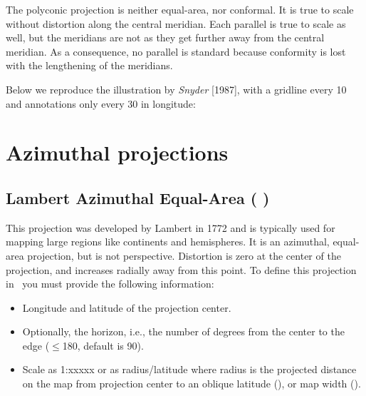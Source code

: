 The polyconic projection is neither equal-area, nor conformal. It is true to scale without distortion along the central meridian. Each parallel is true to scale as well, but the meridians are not as they get further away from the central meridian. As a consequence, no parallel is standard because conformity is lost with the lengthening of the meridians.

Below we reproduce the illustration by \emph{Snyder} [1987], with a gridline every 10\DS{} and annotations only every 30\DS{} in longitude:





\clearpage
\section{Azimuthal projections}

\subsection{Lambert Azimuthal Equal-Area ( )}

This projection was developed by Lambert in 1772 and is
typically used for mapping large regions like continents
and hemispheres.  It is an azimuthal, equal-area projection,
but is not perspective.  Distortion is zero at the center
of the projection, and increases radially away from this
point.  To define this projection in \GMT\ you must provide
the following information:

\begin{itemize}
\item Longitude and latitude of the projection center.
\item Optionally, the horizon, i.e., the number of degrees from the center to the edge ($\le$180\DS, default is 90\DS).
\item Scale as 1:xxxxx or as radius/latitude where radius
is the projected distance on the map from projection center to an oblique
latitude (), or map width ().
\end{itemize}

